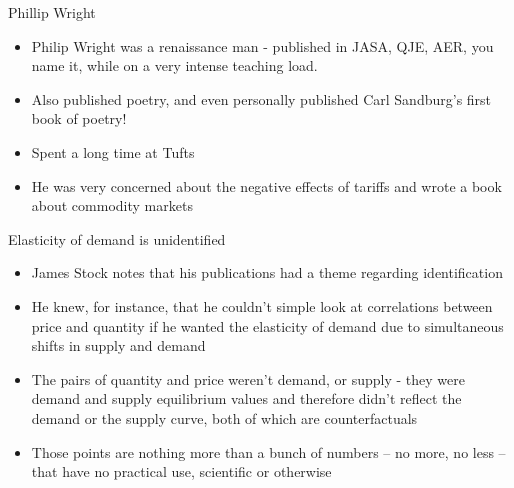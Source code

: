 \documentclass{beamer}
\begin{document}
\begin{frame}{Phillip Wright}

  \begin{itemize}
    \item Philip Wright was a renaissance man - published in JASA, QJE, AER, you name it, while on a very intense teaching load.
    \item Also published poetry, and even personally published Carl Sandburg's first book of poetry!
    \item Spent a long time at Tufts
    \item He was very concerned about the negative effects of tariffs and wrote a book about commodity markets
  \end{itemize}

\end{frame}

\begin{frame}{Elasticity of demand is unidentified}

  \begin{itemize}
    \item James Stock notes that his publications had a theme regarding identification
    \item He knew, for instance, that he couldn't simple look at correlations between price and quantity if he wanted the elasticity of demand due to simultaneous shifts in supply and demand
    \item The pairs of quantity and price weren't demand, or supply - they were demand and supply equilibrium values and therefore didn't reflect the demand or the supply curve, both of which are counterfactuals
    \item Those points are nothing more than a bunch of numbers -- no more, no less -- that have no practical use, scientific or otherwise
  \end{itemize}

\end{frame}
\end{document}

